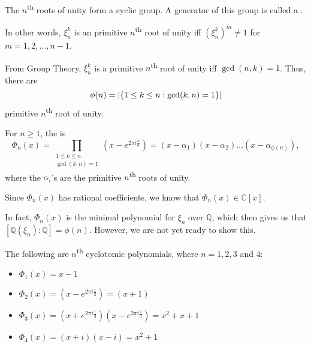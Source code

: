 \documentclass[notoc,notitlepage,nobib]{tufte-book}
\begin{document}
\begin{remark}
  The $n$\textsuperscript{th} roots of unity form a cyclic group. A generator of this
  group is called a .

  In other words, $\xi_n^k$ is an primitive $n$\textsuperscript{th} root of unity iff
  $(\xi_n^k)^m \neq 1$ for $m = 1, 2, \ldots, n - 1$.

  From Group Theory, $\xi_n^k$ is a primitive $n$\textsuperscript{th} root of unity iff
  $\gcd(n, k) = 1$. Thus, there are
  \begin{equation*}
    \phi(n) = \left| \{ 1 \leq k \leq n : \gcd(k, n) = 1 \} \right|
  \end{equation*}
  primitive $n$\textsuperscript{th} root of unity.
\end{remark}

\begin{defn}\label{defn:_n_th_cyclotomic_polynomial}
  For $n \geq 1$, the  is
  \begin{equation*}
    \Phi_n(x) = \prod_{\substack{1 \leq k \leq n \\ \gcd(k, n) = 1}} \left( x - e^{2 \pi i
    \frac{k}{n}} \right) = (x - \alpha_1)(x - \alpha_2) \hdots (x - \alpha_{\phi(n)}),
  \end{equation*}
  where the $\alpha_i$'s are the primitive $n$\textsuperscript{th} roots of unity.
\end{defn}

\begin{remark}
  Since $\Phi_n(x)$ has rational coefficients, we know that $\Phi_n(x) \in \mathbb{C}[x]$.
\end{remark}

In fact, $\Phi_n(x)$ is the minimal polynomial for $\xi_n$ over $\mathbb{Q}$, which then
gives us that $[ \mathbb{Q}(\xi_n) : \mathbb{Q} ] = \phi(n)$. However, we are not yet
ready to show this.

\begin{eg}
  The following are $n$\textsuperscript{th} cyclotomic polynomials, where $n = 1, 2, 3$
  and $4$:
  \begin{itemize}
    \item $\Phi_1(x) = x - 1$
    \item $\Phi_2(x) = \left(x - e^{2 \pi i \frac{1}{2}}\right) = (x + 1)$
    \item $\Phi_3(x) = \left(x + e^{2 \pi i \frac{1}{3}}\right)\left(x - e^{2 \pi i
      \frac{2}{3}}\right) =  x^2 + x + 1$
    \item $\Phi_4(x) = (x + i)(x - i) = x^2 + 1$
  \end{itemize}
\end{eg}
\end{document}
